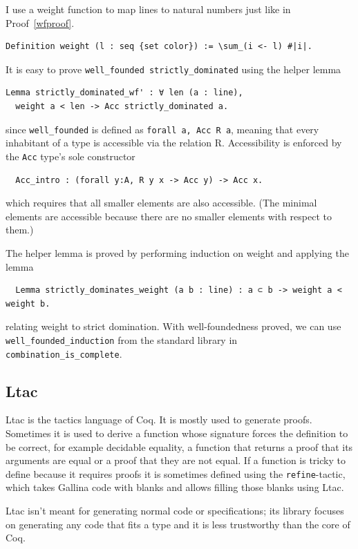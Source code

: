 \documentclass[english, 12pt, a4paper, sci, a-1b, online]{aaltothesis}
\newcommand\icoq[1]{\texttt{#1}}
\begin{document}
I use a weight function to map lines to natural numbers just like in Proof~\ref{wfproof}.
\begin{verbatim}
Definition weight (l : seq {set color}) := \sum_(i <- l) #|i|.
\end{verbatim}
It is easy to prove \icoq{well_founded strictly_dominated} using the helper lemma
\begin{verbatim}
Lemma strictly_dominated_wf' : ∀ len (a : line),
  weight a < len -> Acc strictly_dominated a.
\end{verbatim}
since \icoq{well_founded} is defined as \icoq{forall a, Acc R a}, meaning that every inhabitant of a type is accessible via the relation R. Accessibility is enforced by the \icoq{Acc} type's sole constructor
\begin{verbatim}
  Acc_intro : (forall y:A, R y x -> Acc y) -> Acc x.
\end{verbatim}
which requires that all smaller elements are also accessible. (The minimal elements are accessible because there are no smaller elements with respect to them.)

The helper lemma is proved by performing induction on weight and applying the lemma
\begin{verbatim}
  Lemma strictly_dominates_weight (a b : line) : a ⊂ b -> weight a < weight b.
\end{verbatim}
relating weight to strict domination. With well-foundedness proved, we can use \icoq{well_founded_induction} from the standard library in \icoq{combination_is_complete}.

\subsection{Ltac}\label{ltac}

Ltac is the tactics language of Coq. It is mostly used to generate proofs. Sometimes it is used to derive a function whose signature forces the definition to be correct, for example decidable equality, a function that returns a proof that its arguments are equal or a proof that they are not equal. If a function is tricky to define because it requires proofs it is sometimes defined using the \icoq{refine}-tactic, which takes Gallina code with blanks and allows filling those blanks using Ltac.

Ltac isn't meant for generating normal code or specifications; its library focuses on generating any code that fits a type and it is less trustworthy than the core of Coq.
\end{document}

